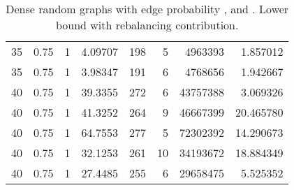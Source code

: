 \documentclass[a4paper,11pt]{article}
\begin{document}
\begin{table}
\begin{center}
\begin{tabular}{|rrr|r|r|rr|r|}
35 & 0.75 & 1 & 4.09707 & 198 & 5 & 4963393 & 1.857012 \\
35 & 0.75 & 1 & 3.98347 & 191 & 6 & 4768656 & 1.942667 \\
40 & 0.75 & 1 & 39.3355 & 272 & 6 & 43757388 & 3.069326 \\
40 & 0.75 & 1 & 41.3252 & 264 & 9 & 46667399 & 20.465780 \\
40 & 0.75 & 1 & 64.7553 & 277 & 5 & 72302392 & 14.290673 \\
40 & 0.75 & 1 & 32.1253 & 261 & 10 & 34193672 & 18.884349 \\
40 & 0.75 & 1 & 27.4485 & 255 & 6 & 29658475 & 5.525352 \\
\hline
\end{tabular}
\end{center}
\caption{Dense random graphs with edge probability ,
   and . Lower bound with rebalancing contribution.}
\label{tab:dense-rebal}
\end{table}
\end{document}
